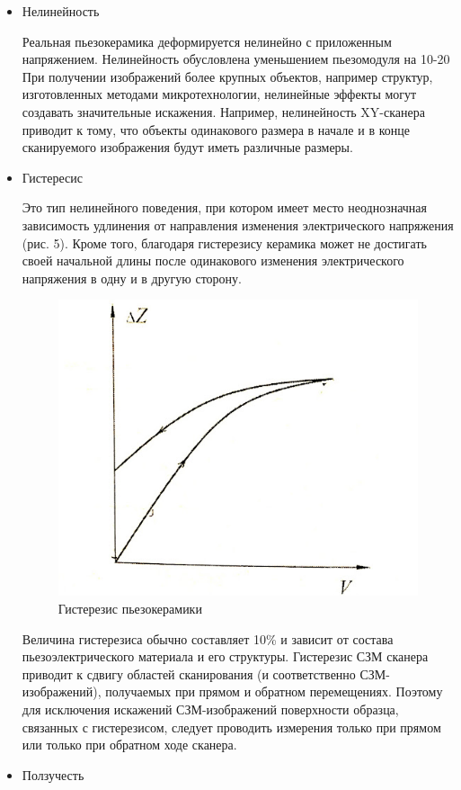 \documentclass[a4paper,12pt]{article}
\theoremstyle{plain} %
\theoremstyle{definition} %
\theoremstyle{remark} %
\begin{document}
\begin{itemize}
	\item
	Нелинейность
	
	
	Реальная пьезокерамика деформируется нелинейно с приложенным напряжением. Нелинейность обусловлена уменьшением пьезомодуля на 10-20%
	При получении изображений более крупных объектов, например структур, изготовленных методами микротехнологии, нелинейные эффекты могут создавать значительные искажения. Например, нелинейность XY-сканера приводит к тому, что объекты одинакового размера в начале и в конце сканируемого изображения будут иметь различные размеры.
	\item
	Гистересис 
	
	
	Это тип нелинейного поведения, при котором имеет место неоднозначная зависимость удлинения от направления изменения электрического напряжения (рис. 5). Кроме того, благодаря гистерезису керамика может не достигать своей начальной длины после одинакового изменения электрического напряжения в одну и в другую сторону.
	\begin{figure}[H]
		\centering
		\includegraphics[scale=0.6]{pic8.jpg}
		\caption{Гистерезис пьезокерамики}
		\label{pic8}
	\end{figure}
	Величина гистерезиса обычно составляет 10\% и зависит от состава пьезоэлектрического материала и его структуры.
	Гистерезис СЗМ сканера приводит к сдвигу областей сканирования (и соответственно СЗМ-изображений), получаемых при прямом и обратном перемещениях. Поэтому для исключения искажений СЗМ-изображений поверхности образца, связанных с гистерезисом, следует проводить измерения только при прямом или только при обратном ходе сканера.
	\item 
	Ползучесть 
	

\end{itemize}
\end{document}

